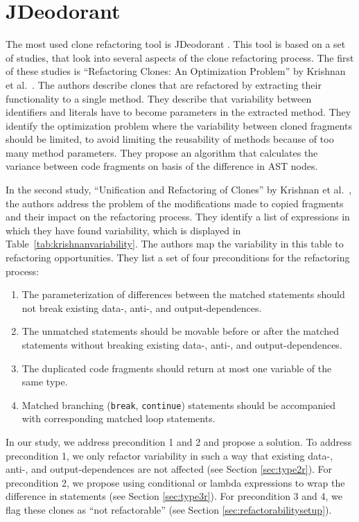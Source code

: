 \section{JDeodorant} \label{sec:jdeodorant}
The most used clone refactoring tool is JDeodorant \cite{mazinanian2016jdeodorant}. This tool is based on a set of studies, that look into several aspects of the clone refactoring process. The first of these studies is ``Refactoring Clones: An Optimization Problem'' by Krishnan et al.~\cite{krishnan2013refactoring}. The authors describe clones that are refactored by extracting their functionality to a single method. They describe that variability between identifiers and literals have to become parameters in the extracted method. They identify the optimization problem where the variability between cloned fragments should be limited, to avoid limiting the reusability of methods because of too many method parameters. They propose an algorithm that calculates the variance between code fragments on basis of the difference in AST nodes.

In the second study, ``Unification and Refactoring of Clones'' by Krishnan et al.~\cite{krishnan2014unification}, the authors address the problem of the modifications made to copied fragments and their impact on the refactoring process. They identify a list of expressions in which they have found variability, which is displayed in Table~\ref{tab:krishnanvariability}. The authors map the variability in this table to refactoring opportunities. They list a set of four preconditions for the refactoring process:
\begin{enumerate}
  \item The parameterization of differences between the matched statements should not break existing data-, anti-, and output-dependences.
  \item The unmatched statements should be movable before or after the matched statements without breaking existing data-, anti-, and output-dependences.
  \item The duplicated code fragments should return at most one variable of the same type.
  \item Matched branching (\texttt{break}, \texttt{continue}) statements should be accompanied with corresponding matched loop statements.
\end{enumerate}
In our study, we address precondition 1 and 2 and propose a solution. To address precondition 1, we only refactor variability in such a way that existing data-, anti-, and output-dependences are not affected (see Section \ref{sec:type2r}). For precondition 2, we propose using conditional or lambda expressions to wrap the difference in statements (see Section \ref{sec:type3r}). For precondition 3 and 4, we flag these clones as ``not refactorable'' (see Section \ref{sec:refactorabilitysetup}).

